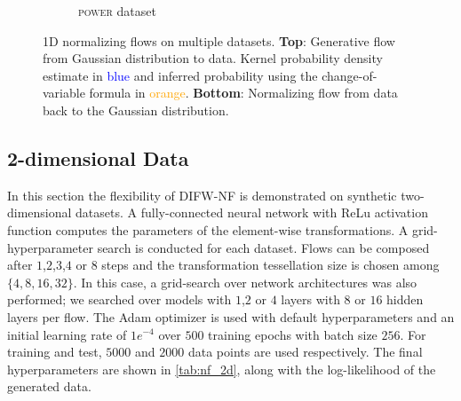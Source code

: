 \begin{figure}[!htb]
\begin{center}
\begin{subfigure}[b]{0.48\linewidth}
      \caption{\textsc{power} dataset}
      \label{fig:NF_1D_POWER}
    \end{subfigure}
    \caption{1D normalizing flows on multiple datasets. \textbf{Top}: Generative flow from Gaussian distribution to data. Kernel probability density estimate in \textcolor{blue}{blue} and inferred probability using the change-of-variable formula in \textcolor{orange}{orange}. \textbf{Bottom}: Normalizing flow from data back to the Gaussian distribution.}
    \label{fig:nf_1d_datasets}
  \end{center}
\end{figure}

\subsection{2-dimensional Data}

In this section the flexibility of DIFW-NF is demonstrated on synthetic two-dimensional datasets. A fully-connected neural network with ReLu activation function computes the parameters of the element-wise transformations.
A grid-hyperparameter search is conducted for each dataset. Flows can be composed after $1$,$2$,$3$,$4$ or $8$ steps and the transformation tessellation size is chosen among $\{4,8,16,32\}$.
In this case, a grid-search over network architectures was also performed; we searched over models with $1$,$2$ or $4$ layers with $8$ or $16$ hidden layers per flow.
The Adam optimizer \cite{kingma2014adam} is used with default hyperparameters and an initial learning rate of $1e^{-4}$ over $500$ training epochs with batch size $256$. For training and test, $5000$ and $2000$ data points are used respectively. 
The final hyperparameters are shown in \cref{tab:nf_2d}, along with the log-likelihood of the generated data.


